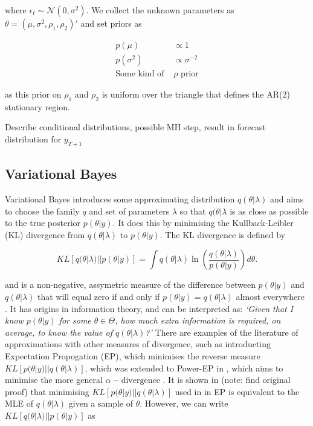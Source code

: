 \documentclass{article}\usepackage[]{graphicx}\usepackage[]{color}
\numberwithin{equation}{section}
\begin{document}
where $\epsilon_t \sim \mathcal{N}(0, \sigma^2)$. We collect the unknown parameters as $\theta = (\mu, \sigma^2, \rho_1, \rho_2)'$ and set priors as

\begin{align}
p(\mu) &\propto 1 \nonumber \\
p(\sigma^2) &\propto \sigma^{-2} \nonumber \\
\mbox{Some kind of }&\rho \mbox{ prior}
\end{align}

as this prior on $\rho_1$ and $\rho_2$ is uniform over the triangle that defines the AR(2) stationary region.

Describe conditional distributions, possible MH step, result in forecast distribution for $y_{T+1}$

\subsection{Variational Bayes}

Variational Bayes introduces some approximating distribution $q(\theta | \lambda)$ and aims to choose the family $q$ and set of parameters $\lambda$ so that $q(\theta | \lambda$ is as close as possible to the true posterior $p(\theta | y)$. It does this by minimising the Kullback-Leibler (KL) divergence \citep{Kullback1951} from $q(\theta | \lambda)$ to $p(\theta | y)$. The KL divergence is defined by

\begin{equation}
\label{KL-def}
KL[q(\theta | \lambda)||p(\theta | y)] = \int q(\theta | \lambda) \ln \left( \frac{q(\theta | \lambda)}{p(\theta | y)}\right) d\theta.
\end{equation}

and is a non-negative, assymetric measure of the difference between $p(\theta | y)$ and $q(\theta | \lambda)$ that will equal zero if and only if $p(\theta | y) = q(\theta | \lambda)$ almost everywhere \citep{Bishop2006}. It has origins in information theory, and can be interpreted as: \textit{`Given that I know $p(\theta | y)$ for some $\theta \in \Theta$, how much extra information is required, on average, to know the value of $q(\theta | \lambda)$?'} There are examples of the literature of approximations with other measures of divergence, such as \citet{Minka2001} introducting Expectation Propogation (EP), which minimises the reverse measure $KL[p(\theta | y)||q(\theta |\lambda)]$, which was extended to Power-EP in \citet{Minka2004}, which aims to minimise the more general $\alpha-\mbox{divergence}$ \citep{Amari1985}. It is shown in \citet{Bishop2006} (note: find original proof) that minimising $KL[p(\theta | y)||q(\theta | \lambda)]$ used in in EP is equivalent to the MLE of $q(\theta | \lambda)$ given a sample of $\theta$. However, we can write $KL[q(\theta | \lambda)||p(\theta | y)]$ as
\end{document}
